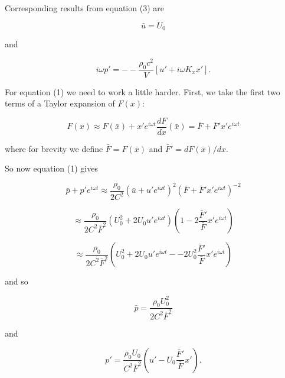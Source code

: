   Corresponding results from equation (3) are 

  \begin{equation*}\bar{u}=U_0 \tag{7}\end{equation*} 

  \noindent{}and 

  \begin{equation*}i \omega p' = -- \dfrac{\rho_0 c^2}{V} [u'+i \omega K_x x'] 
  . \tag{8}\end{equation*} 

  For equation (1) we need to work a little harder. First, we take the first 
  two terms of a Taylor expansion of $F(x)$: 

  \begin{equation*}F(x) \approx F(\bar{x}) + x' e^{i \omega t} 
  \dfrac{dF}{dx}(\bar{x})=\bar{F}+\bar{F}' x' e^{i \omega 
  t}\tag{9}\end{equation*} 

  \noindent{}where for brevity we define $\bar{F}=F(\bar{x})$ and 
  $\bar{F}'=dF(\bar{x})/dx$. 

  So now equation (1) gives 

  \begin{equation*}\bar{p}+p'e^{i \omega t}\approx \dfrac{\rho_0}{2C^2}\left( 
  \bar{u}+u'e^{i \omega t} \right)^2\left(\bar{F}+\bar{F}' x' e^{i \omega t} 
  \right)^{-2}\end{equation*} 

  \begin{equation*}\approx \dfrac{\rho_0}{2C^2 \bar{F}^2}\left( U_0^2 + 2 U_0 
  u' e^{i \omega t} \right) \left(1-2\dfrac{\bar{F}'}{\bar{F}} x' e^{i \omega 
  t} \right)\end{equation*} 

  \begin{equation*}\approx \dfrac{\rho_0}{2C^2 \bar{F}^2}\left( U_0^2 +2 U_0 u' 
  e^{i \omega t} -- 2U_0^2 \dfrac{\bar{F}'}{\bar{F}} x' e^{i \omega t} 
  \right)\tag{10}\end{equation*} 

  \noindent{}and so 

  \begin{equation*}\bar{p} =\dfrac{\rho_0 U_0^2}{2C^2 
  \bar{F}^2}\tag{11}\end{equation*} 

  \noindent{}and 

  \begin{equation*}p'=\dfrac{\rho_0 U_0}{C^2 \bar{F}^2}\left(u'-U_0 
  \dfrac{\bar{F}'}{\bar{F}}x' \right). \tag{12}\end{equation*} 

